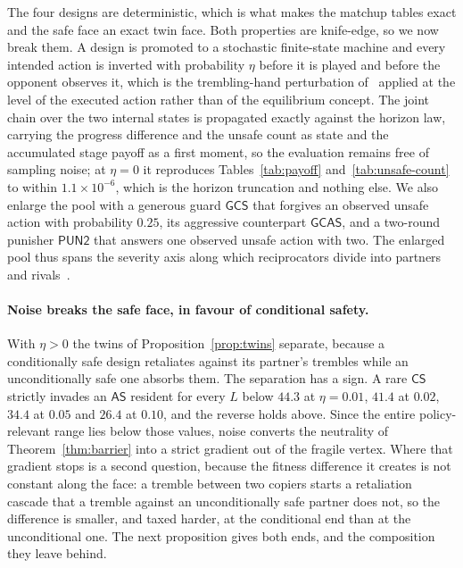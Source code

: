 \documentclass[pdflatex]{sn-jnl}
\theoremstyle{thmstyleone}
\theoremstyle{thmstylethree}
\theoremstyle{thmstyletwo}
\newcommand{\AS}{\textsf{AS}}
\newcommand{\CS}{\textsf{CS}}
\begin{document}
The four designs are deterministic, which is what makes the matchup tables
exact and the safe face an exact twin face. Both properties are knife-edge, so
we now break them. A design is promoted to a stochastic finite-state machine
and every intended action is inverted with probability $\eta$ before it is
played and before the opponent observes it, which is the trembling-hand
perturbation of~\citet{selten1975reexamination} applied at the level of the
executed action rather than of the equilibrium concept. The joint chain over
the two
internal states is propagated exactly against the horizon law, carrying the
progress difference and the unsafe count as state and the accumulated stage
payoff as a first moment, so the evaluation remains free of sampling noise; at
$\eta=0$ it reproduces Tables~\ref{tab:payoff} and~\ref{tab:unsafe-count} to
within $1.1\times10^{-6}$, which is the horizon truncation and nothing else. We also enlarge the pool with a
generous guard $\mathsf{GCS}$ that forgives an observed unsafe action with
probability $0.25$, its aggressive counterpart $\mathsf{GCAS}$, and a
two-round punisher $\mathsf{PUN2}$ that answers one observed unsafe action
with two. The enlarged pool thus spans the severity axis along which
reciprocators divide into partners and rivals~\citep{hilbe2018partners}.

\paragraph{Noise breaks the safe face, in favour of conditional safety.}
With $\eta>0$ the twins of Proposition~\ref{prop:twins} separate, because a
conditionally safe design retaliates against its partner's trembles while an
unconditionally safe one absorbs them. The separation has a sign. A rare $\CS$
strictly invades an $\AS$ resident for every $L$ below $44.3$ at $\eta=0.01$,
$41.4$ at $0.02$, $34.4$ at $0.05$ and $26.4$ at $0.10$, and the reverse
holds above. Since the entire policy-relevant range lies below those values,
noise converts the neutrality of Theorem~\ref{thm:barrier} into a strict
gradient out of the fragile vertex. Where that gradient stops is a second
question, because the fitness difference it creates is not constant along the
face: a tremble between two copiers starts a retaliation cascade that a
tremble against an unconditionally safe partner does not, so the difference
is smaller, and taxed harder, at the conditional end than at the
unconditional one. The next proposition gives both ends, and the composition
they leave behind.
\end{document}
